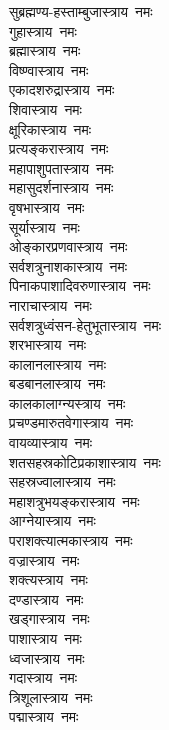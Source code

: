 \begin{flushleft}
\begin{multicols}{2}
सुब्रह्मण्य-हस्ताम्बुजास्त्राय~नमः\\
गुहास्त्राय~नमः\\
ब्रह्मास्त्राय~नमः\\
विष्ण्वास्त्राय~नमः\\
एकादशरुद्रास्त्राय~नमः\\
शिवास्त्राय~नमः\\
क्षूरिकास्त्राय~नमः\\
प्रत्यङ्करास्त्राय~नमः\\
महापाशुपतास्त्राय~नमः\\
महासुदर्शनास्त्राय~नमः\hfill{}\\
वृषभास्त्राय~नमः\\
सूर्यास्त्राय~नमः\\
ओङ्कारप्रणवास्त्राय~नमः\\
सर्वशत्रुनाशकास्त्राय~नमः\\
पिनाकपाशादिवरुणास्त्राय~नमः\\
नाराचास्त्राय~नमः\\
सर्वशत्रुध्वंसन-हेतुभूतास्त्राय~नमः\\
शरभास्त्राय~नमः\\
कालानलास्त्राय~नमः\\
बडबानलास्त्राय~नमः \hfill{}\\
कालकालाग्न्यस्त्राय~नमः\\
प्रचण्डमारुतवेगास्त्राय~नमः\\
वायव्यास्त्राय~नमः\\
शतसहस्रकोटिप्रकाशास्त्राय~नमः\\
सहस्रज्वालास्त्राय~नमः\\
महाशत्रुभयङ्करास्त्राय~नमः\\
आग्नेयास्त्राय~नमः\\
पराशक्त्यात्मकास्त्राय~नमः\\
वज्रास्त्राय~नमः\\
शक्त्यस्त्राय~नमः\hfill{}\\
दण्डास्त्राय~नमः\\
खड्गास्त्राय~नमः\\
पाशास्त्राय~नमः\\
ध्वजास्त्राय~नमः\\
गदास्त्राय~नमः\\
त्रिशूलास्त्राय~नमः\\
पद्मास्त्राय~नमः\\

\end{multicols}
\end{flushleft}
